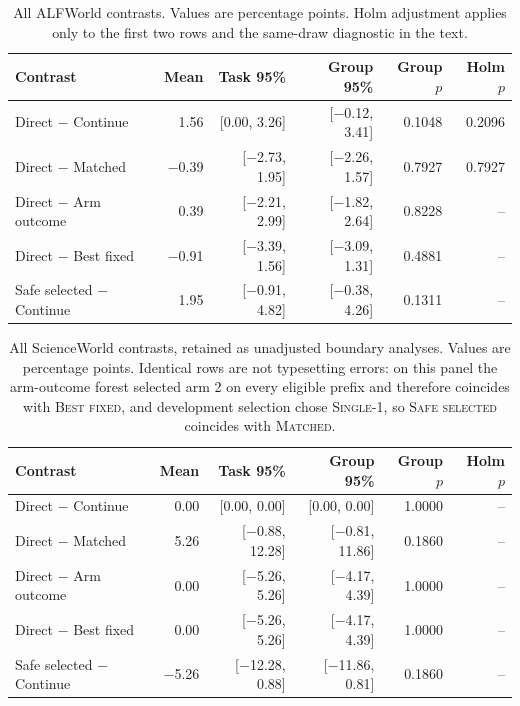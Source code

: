\begin{table}[ht]
\caption{All ALFWorld contrasts. Values are percentage points. Holm adjustment applies only to the first two rows and the same-draw diagnostic in the text.}
\label{tab:alfworld-contrasts}
\centering
\scriptsize
\begin{tabular}{@{}lrrrrr@{}}
\toprule
Contrast & Mean & Task 95\% & Group 95\% & Group $p$ & Holm $p$ \\
\midrule
Direct $-$ Continue & 1.56 & [0.00, 3.26] & [$-$0.12, 3.41] & 0.1048 & 0.2096 \\
Direct $-$ Matched & $-$0.39 & [$-$2.73, 1.95] & [$-$2.26, 1.57] & 0.7927 & 0.7927 \\
Direct $-$ Arm outcome & 0.39 & [$-$2.21, 2.99] & [$-$1.82, 2.64] & 0.8228 & -- \\
Direct $-$ Best fixed & $-$0.91 & [$-$3.39, 1.56] & [$-$3.09, 1.31] & 0.4881 & -- \\
Safe selected $-$ Continue & 1.95 & [$-$0.91, 4.82] & [$-$0.38, 4.26] & 0.1311 & -- \\
\bottomrule
\end{tabular}
\end{table}

\begin{table}[ht]
\caption{All ScienceWorld contrasts, retained as unadjusted boundary analyses. Values are percentage points. Identical rows are not typesetting errors: on this panel the arm-outcome forest selected arm 2 on every eligible prefix and therefore coincides with \textsc{Best fixed}, and development selection chose \textsc{Single-1}, so \textsc{Safe selected} coincides with \textsc{Matched}.}
\label{tab:scienceworld-contrasts}
\centering
\scriptsize
\begin{tabular}{@{}lrrrrr@{}}
\toprule
Contrast & Mean & Task 95\% & Group 95\% & Group $p$ & Holm $p$ \\
\midrule
Direct $-$ Continue & 0.00 & [0.00, 0.00] & [0.00, 0.00] & 1.0000 & -- \\
Direct $-$ Matched & 5.26 & [$-$0.88, 12.28] & [$-$0.81, 11.86] & 0.1860 & -- \\
Direct $-$ Arm outcome & 0.00 & [$-$5.26, 5.26] & [$-$4.17, 4.39] & 1.0000 & -- \\
Direct $-$ Best fixed & 0.00 & [$-$5.26, 5.26] & [$-$4.17, 4.39] & 1.0000 & -- \\
Safe selected $-$ Continue & $-$5.26 & [$-$12.28, 0.88] & [$-$11.86, 0.81] & 0.1860 & -- \\
\bottomrule
\end{tabular}
\end{table}


